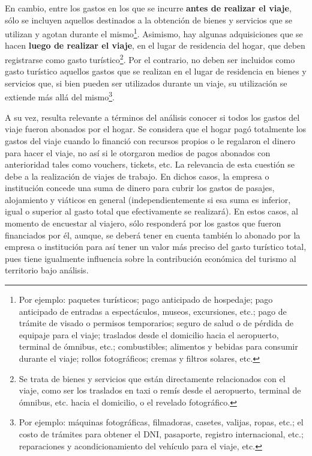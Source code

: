 \documentclass[
]{book}
\begin{document}
En cambio, entre los gastos en los que se incurre \textbf{antes de realizar el viaje}, sólo se incluyen aquellos destinados a la obtención de bienes y servicios que se utilizan y agotan durante el mismo\footnote{Por ejemplo: paquetes turísticos; pago anticipado de hospedaje; pago anticipado de entradas a espectáculos, museos, excursiones, etc.; pago de trámite de visado o permisos temporarios; seguro de salud o de pérdida de equipaje para el viaje; traslados desde el domicilio hacia el aeropuerto, terminal de ómnibus, etc.; combustibles; alimentos y bebidas para consumir durante el viaje; rollos fotográficos; cremas y filtros solares, etc.}. Asimismo, hay algunas adquisiciones que se hacen \textbf{luego de realizar el viaje}, en el lugar de residencia del hogar, que deben registrarse como gasto turístico\footnote{Se trata de bienes y servicios que están directamente relacionados con el viaje, como ser los traslados en taxi o remís desde el aeropuerto, terminal de ómnibus, etc. hacia el domicilio, o el revelado fotográfico.}. Por el contrario, no deben ser incluidos como gasto turístico aquellos gastos que se realizan en el lugar de residencia en bienes y servicios que, si bien pueden ser utilizados durante un viaje, su utilización se extiende más allá del mismo\footnote{Por ejemplo: máquinas fotográficas, filmadoras, casetes, valijas, ropas, etc.; el costo de trámites para obtener el DNI, pasaporte, registro internacional, etc.; reparaciones y acondicionamiento del vehículo para el viaje, etc.}.

A su vez, resulta relevante a términos del análisis conocer si todos los gastos del viaje fueron abonados por el hogar. Se considera que el hogar pagó totalmente los gastos del viaje cuando lo financió con recursos propios o le regalaron el dinero para hacer el viaje, no así si le otorgaron medios de pagos abonados con anterioridad tales como vouchers, tickets, etc. La relevancia de esta cuestión se debe a la realización de viajes de trabajo. En dichos casos, la empresa o institución concede una suma de dinero para cubrir los gastos de pasajes, alojamiento y viáticos en general (independientemente si esa suma es inferior, igual o superior al gasto total que efectivamente se realizará). En estos casos, al momento de encuestar al viajero, sólo responderá por los gastos que fueron financiados por él, aunque, se deberá tener en cuenta también lo abonado por la empresa o institución para así tener un valor más preciso del gasto turístico total, pues tiene igualmente influencia sobre la contribución económica del turismo al territorio bajo análisis.
\end{document}

